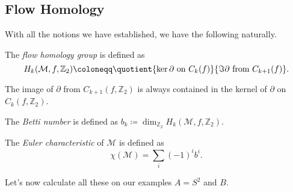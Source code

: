 \subsection{Flow Homology}
With all the notions we have established, we have the following naturally.

\begin{definition}\label{def:flow-homology-group}
	The \emph{flow homology group} is defined as
	\[
		H_k(\mathcal{M} , f, \mathbb{Z} _2) \coloneqq \quotient{\ker \partial \text{ on } C_k(f)}{\Im \partial  \text{ from } C_{k+1}(f)}.
	\]
\end{definition}

\begin{remark}
	The image of \(\partial \) from \(C_{k+1}(f, \mathbb{Z} _2)\) is always contained in the kernel of \(\partial\) on \(C_k(f, \mathbb{Z} _2)\).
\end{remark}

\begin{definition}\label{def:Betti-number}
	The \emph{Betti number} is defined as \(b_k \coloneqq \dim _{\mathbb{Z} _2}H_k(\mathcal{M} , f, \mathbb{Z} _2)\).
\end{definition}

\begin{definition}\label{def:Euler-characteristic}
	The \emph{Euler characteristic} of \(\mathcal{M} \) is defined as
	\[
		\chi (\mathcal{M} ) = \sum_{i} (-1)^{i} b^i.
	\]
\end{definition}

Let's now calculate all these on our examples \(A = S^2\) and \(B\).

